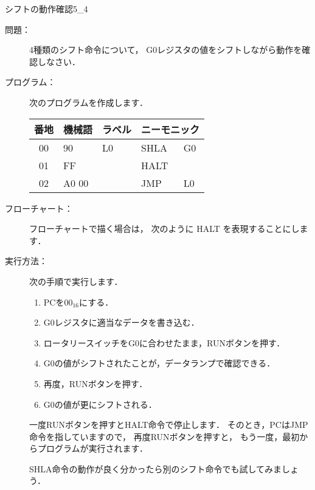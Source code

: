 \newpage
\begin{reidai}{シフトの動作確認}{5_4}
  \begin{description}
  \item[問題：] 4種類のシフト命令について，
    G0レジスタの値をシフトしながら動作を確認しなさい．

  \item[プログラム：]
    次のプログラムを作成します．

    \begin{center}
      {\ttfamily\small
        \begin{tabular}{|c|l|l|l l|} \hline
          番地 & 機械語 & ラベル & \multicolumn{2}{|c|}{ニーモニック} \\
          \hline
          00 & 90    & L0  & SHLA & G0     \\
          01 & FF    &     & HALT &        \\
          02 & A0 00 &     & JMP  & L0     \\
          \hline
        \end{tabular}
      }
    \end{center}

  \item[フローチャート：] フローチャートで描く場合は，
    次のように HALT を表現することにします．

    \begin{center}
    \end{center}


  \item[実行方法：] 次の手順で実行します．
    \begin{enumerate}
    \item PCを$00_{16}$にする．
    \item G0レジスタに適当なデータを書き込む．
    \item ロータリースイッチをG0に合わせたまま，RUNボタンを押す．
    \item G0の値がシフトされたことが，データランプで確認できる．
    \item 再度，RUNボタンを押す．
    \item G0の値が更にシフトされる．
    \end{enumerate}

    \vspace{1ex}
    一度RUNボタンを押すとHALT命令で停止します．
    そのとき，PCはJMP命令を指していますので，
    再度RUNボタンを押すと，
    もう一度，最初からプログラムが実行されます．

    \vspace{1ex}
    SHLA命令の動作が良く分かったら別のシフト命令でも試してみましょう．

  \end{description}
\end{reidai}

